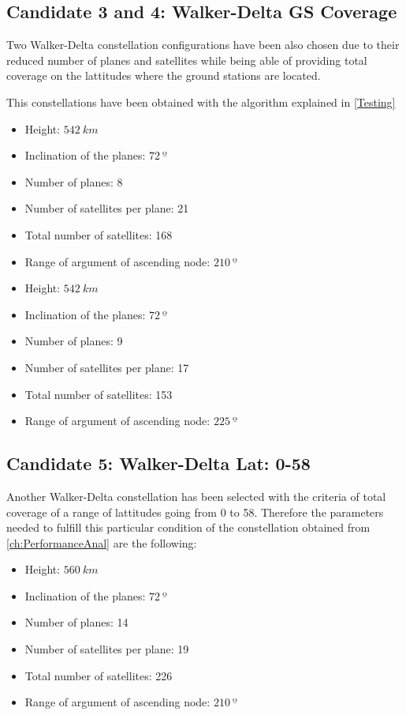 \subsection{Candidate 3 and 4: Walker-Delta GS Coverage}

Two Walker-Delta constellation configurations have been also chosen due to their reduced number of planes and satellites while being able of providing total coverage on the lattitudes where the ground stations are located.

This constellations have been obtained with the algorithm explained in \ref{Testing}

\begin{itemize}
\item Height: $542~{km}$ 
\item Inclination of the planes: $72~{º}$  
\item Number of planes: 8
\item Number of satellites per plane: 21
\item Total number of satellites: 168
\item Range of argument of ascending node: $210~{º}$ 
\end{itemize}

\begin{itemize}
\item Height: $542~{km}$ 
\item Inclination of the planes: $72~{º}$  
\item Number of planes: 9
\item Number of satellites per plane: 17
\item Total number of satellites: 153
\item Range of argument of ascending node: $225~{º}$
\end{itemize}

\subsection{Candidate 5: Walker-Delta Lat: 0-58}
Another Walker-Delta constellation has been selected with the criteria of total coverage of a range of lattitudes going from 0 to 58. Therefore the parameters needed to fulfill this particular condition of the constellation obtained from \ref{ch:PerformanceAnal} are the following:


\begin{itemize}
	\item Height: $560~{km}$ 
	\item Inclination of the planes: $72~{º}$  
	\item Number of planes: 14
	\item Number of satellites per plane: 19
	\item Total number of satellites: 226
	\item Range of argument of ascending node: $210~{º}$
\end{itemize}


